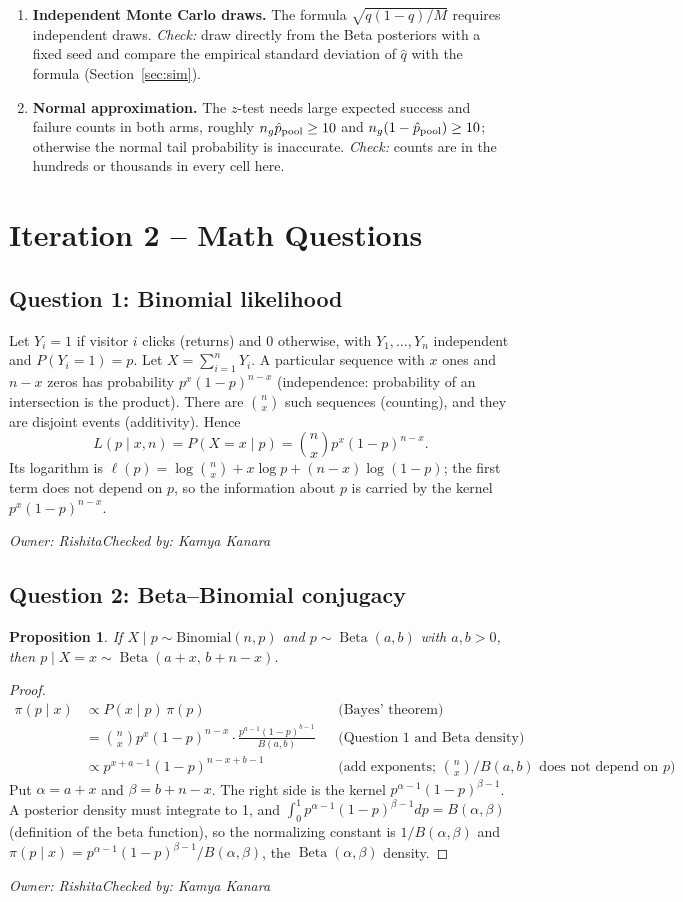 \documentclass[11pt]{article}
\newtheorem{proposition}{Proposition}
\newcommand{\signoff}[2]{\par\smallskip\noindent\textit{Owner: #1\quad Checked by: #2}\par}
\newcommand{\Beta}{\operatorname{Beta}}
\begin{document}
\begin{enumerate}[label=A\arabic*.]
\item \textbf{Independent Monte Carlo draws.} The formula $\sqrt{q(1-q)/M}$ requires independent draws. \emph{Check:} draw directly from the Beta posteriors with a fixed seed and compare the empirical standard deviation of $\hat q$ with the formula (Section~\ref{sec:sim}).
\item \textbf{Normal approximation.} The $z$-test needs large expected success and failure counts in both arms, roughly $n_g\hat p_{\rm pool}\ge10$ and $n_g(1-\hat p_{\rm pool})\ge10$; otherwise the normal tail probability is inaccurate. \emph{Check:} counts are in the hundreds or thousands in every cell here.
\end{enumerate}

\section{Iteration 2 -- Math Questions}\label{sec:questions}
\subsection{Question 1: Binomial likelihood}
Let $Y_i=1$ if visitor $i$ clicks (returns) and $0$ otherwise, with $Y_1,\dots,Y_n$ independent and $P(Y_i=1)=p$. Let $X=\sum_{i=1}^nY_i$.
A particular sequence with $x$ ones and $n-x$ zeros has probability $p^x(1-p)^{n-x}$ (independence: probability of an intersection is the product). There are $\binom{n}{x}$ such sequences (counting), and they are disjoint events (additivity). Hence
\[
L(p\mid x,n)=P(X=x\mid p)=\binom{n}{x}p^x(1-p)^{n-x}.
\]
Its logarithm is $\ell(p)=\log\binom{n}{x}+x\log p+(n-x)\log(1-p)$; the first term does not depend on $p$, so the information about $p$ is carried by the kernel $p^x(1-p)^{n-x}$.
\signoff{Rishita}{Kamya Kanara}

\subsection{Question 2: Beta--Binomial conjugacy}
\begin{proposition}
If $X\mid p\sim\mathrm{Binomial}(n,p)$ and $p\sim\Beta(a,b)$ with $a,b>0$, then $p\mid X=x\sim\Beta(a+x,\,b+n-x)$.
\end{proposition}
\begin{proof}
\begin{align*}
\pi(p\mid x)&\propto P(x\mid p)\,\pi(p) &&\text{(Bayes' theorem)}\\
&=\binom{n}{x}p^x(1-p)^{n-x}\cdot\frac{p^{a-1}(1-p)^{b-1}}{B(a,b)} &&\text{(Question 1 and Beta density)}\\
&\propto p^{x+a-1}(1-p)^{n-x+b-1} &&\text{(add exponents; $\binom{n}{x}/B(a,b)$ does not depend on $p$)}.
\end{align*}
Put $\alpha=a+x$ and $\beta=b+n-x$. The right side is the kernel $p^{\alpha-1}(1-p)^{\beta-1}$. A posterior density must integrate to 1, and $\int_0^1p^{\alpha-1}(1-p)^{\beta-1}dp=B(\alpha,\beta)$ (definition of the beta function), so the normalizing constant is $1/B(\alpha,\beta)$ and $\pi(p\mid x)=p^{\alpha-1}(1-p)^{\beta-1}/B(\alpha,\beta)$, the $\Beta(\alpha,\beta)$ density.
\end{proof}
\signoff{Rishita}{Kamya Kanara}
\end{document}
